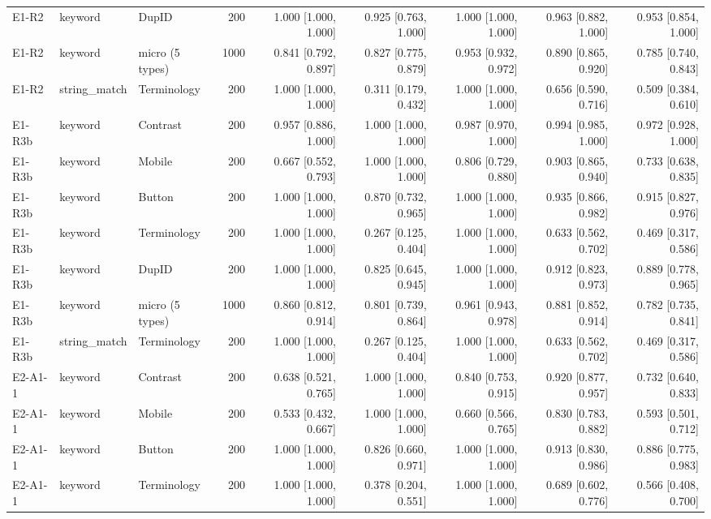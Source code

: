 \begin{table}[t]
\begin{tabular}{lllrrrrrr}
E1-R2 & keyword & DupID & 200 & 1.000 [1.000, 1.000] & 0.925 [0.763, 1.000] & 1.000 [1.000, 1.000] & 0.963 [0.882, 1.000] & 0.953 [0.854, 1.000] \\
E1-R2 & keyword & micro (5 types) & 1000 & 0.841 [0.792, 0.897] & 0.827 [0.775, 0.879] & 0.953 [0.932, 0.972] & 0.890 [0.865, 0.920] & 0.785 [0.740, 0.843] \\
E1-R2 & string\_match & Terminology & 200 & 1.000 [1.000, 1.000] & 0.311 [0.179, 0.432] & 1.000 [1.000, 1.000] & 0.656 [0.590, 0.716] & 0.509 [0.384, 0.610] \\
E1-R3b & keyword & Contrast & 200 & 0.957 [0.886, 1.000] & 1.000 [1.000, 1.000] & 0.987 [0.970, 1.000] & 0.994 [0.985, 1.000] & 0.972 [0.928, 1.000] \\
E1-R3b & keyword & Mobile & 200 & 0.667 [0.552, 0.793] & 1.000 [1.000, 1.000] & 0.806 [0.729, 0.880] & 0.903 [0.865, 0.940] & 0.733 [0.638, 0.835] \\
E1-R3b & keyword & Button & 200 & 1.000 [1.000, 1.000] & 0.870 [0.732, 0.965] & 1.000 [1.000, 1.000] & 0.935 [0.866, 0.982] & 0.915 [0.827, 0.976] \\
E1-R3b & keyword & Terminology & 200 & 1.000 [1.000, 1.000] & 0.267 [0.125, 0.404] & 1.000 [1.000, 1.000] & 0.633 [0.562, 0.702] & 0.469 [0.317, 0.586] \\
E1-R3b & keyword & DupID & 200 & 1.000 [1.000, 1.000] & 0.825 [0.645, 0.945] & 1.000 [1.000, 1.000] & 0.912 [0.823, 0.973] & 0.889 [0.778, 0.965] \\
E1-R3b & keyword & micro (5 types) & 1000 & 0.860 [0.812, 0.914] & 0.801 [0.739, 0.864] & 0.961 [0.943, 0.978] & 0.881 [0.852, 0.914] & 0.782 [0.735, 0.841] \\
E1-R3b & string\_match & Terminology & 200 & 1.000 [1.000, 1.000] & 0.267 [0.125, 0.404] & 1.000 [1.000, 1.000] & 0.633 [0.562, 0.702] & 0.469 [0.317, 0.586] \\
E2-A1-1 & keyword & Contrast & 200 & 0.638 [0.521, 0.765] & 1.000 [1.000, 1.000] & 0.840 [0.753, 0.915] & 0.920 [0.877, 0.957] & 0.732 [0.640, 0.833] \\
E2-A1-1 & keyword & Mobile & 200 & 0.533 [0.432, 0.667] & 1.000 [1.000, 1.000] & 0.660 [0.566, 0.765] & 0.830 [0.783, 0.882] & 0.593 [0.501, 0.712] \\
E2-A1-1 & keyword & Button & 200 & 1.000 [1.000, 1.000] & 0.826 [0.660, 0.971] & 1.000 [1.000, 1.000] & 0.913 [0.830, 0.986] & 0.886 [0.775, 0.983] \\
E2-A1-1 & keyword & Terminology & 200 & 1.000 [1.000, 1.000] & 0.378 [0.204, 0.551] & 1.000 [1.000, 1.000] & 0.689 [0.602, 0.776] & 0.566 [0.408, 0.700] \\

\end{tabular}
\end{table}
